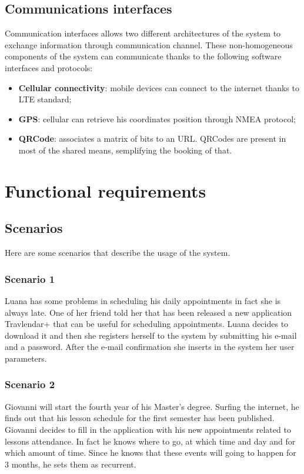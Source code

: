 \subsection{Communications interfaces}
Communication interfaces allows two different architectures of the system to exchange information through communication channel. These non-homogeneous components of the system can communicate thanks to the following software interfaces and protocols:
\begin{itemize}
\item \textbf{Cellular connectivity}: mobile devices can connect to the internet thanks to LTE standard;
\item \textbf{GPS}: cellular can retrieve his coordinates position through NMEA protocol;
\item \textbf{QRCode}: associates a matrix of bits to an URL. QRCodes are present in most of the shared means, semplifying the booking of that.
\end{itemize}


\section{Functional requirements}
\subsection{Scenarios}

Here are some scenarios that describe the usage of the system.

\subsubsection{Scenario 1} \label{scenario:1}
Luana has some problems in scheduling his daily appointments in fact she is always late. One of her friend told her that has been released a new application Travlendar+ that can be useful for scheduling appointments. Luana decides to download it and then she registers herself to the system by submitting his e-mail and a password. After the e-mail confirmation she inserts in the system her user parameters.


\subsubsection{Scenario 2} \label{scenario:2}
Giovanni will start the fourth year of his Master's degree. Surfing the internet, he finds out that his lesson schedule for the first semester has been published. Giovanni decides to fill in the application with his new appointments related to lessons attendance. In fact he knows where to go, at which time and day and for which amount of time. Since he knows that these events will going to happen for 3 months, he sets them as recurrent.

